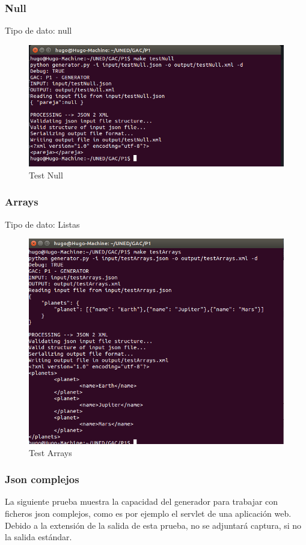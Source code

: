 \documentclass[a4paper,11pt]{book}
\begin{document}
\subsubsection{Null}
Tipo de dato: null

\begin{figure}[H]  
\centering 
\includegraphics[scale=0.35]{imagenes/testNull.png}
\caption{ Test Null  }  
\end{figure} 

\subsubsection{Arrays}
Tipo de dato: Listas

\begin{figure}[H]  
\centering 
\includegraphics[scale=0.35]{imagenes/testArrays.png}
\caption{ Test Arrays  }  
\end{figure} 

\subsubsection{Json complejos}
La siguiente prueba muestra la capacidad del generador para trabajar con ficheros json complejos, como es por ejemplo el servlet de una aplicación web. Debido a la extensión de la salida de esta prueba, no se adjuntará captura, si no la salida estándar. 
 
\end{document}
